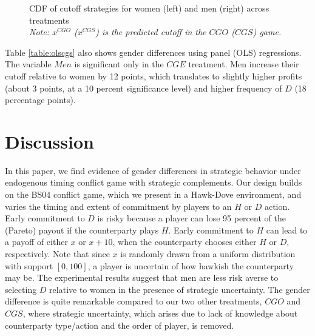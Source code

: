 \documentclass[11pt,english]{article}
\begin{document}
\begin{center}
\begin{figure}[ht]
\begin{minipage}[t]{0.45\columnwidth}
\end{minipage} 
\caption{CDF of cutoff strategies for women (left) and men (right) across treatments\\\footnotesize{\textit{Note: $x^{CGO}$ ($x^{CGS}$) is the predicted cutoff in the $CGO$ ($CGS$) game.}}}
\label{fig:cdfall}\end{figure}
\par\end{center}

Table \ref{table:olscgs} also shows gender differences using panel (OLS) regressions. The variable $Men$ is significant only in the $CGE$ treatment. Men increase their cutoff relative to women by 12 points, which translates to slightly higher profits (about 3 points, at a 10 percent significance level) and higher frequency of $D$ (18 percentage points).

\section{Discussion}
\label{sec:discuss}

In this paper, we find evidence of gender differences in strategic behavior under endogenous timing conflict game with strategic complements. Our design builds on the BS04 conflict game, which we present in a Hawk-Dove environment, and varies the timing and extent of commitment by players to an $H$ or $D$ action. Early commitment to $D$ is risky because a player can lose 95 percent of the (Pareto) payout if the counterparty plays $H$. Early commitment to $H$ can lead to a payoff of either $x$ or $x+10$, when the counterparty chooses either $H$ or $D$, respectively.  Note that since  $x$ is randomly drawn from a uniform distribution with support $[0,100]$, a player is uncertain of how hawkish the counterparty may be. The experimental results suggest that men are less risk averse to selecting $D$ relative to women in the presence of strategic uncertainty. The gender difference is quite remarkable compared to our two other treatments, $CGO$ and $CGS$, where strategic uncertainty, which arises due to lack of knowledge about counterparty type/action and the order of player, is removed.
\end{document}
